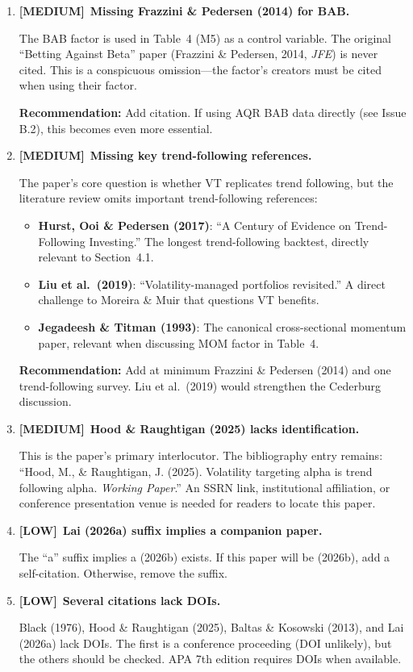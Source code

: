 \documentclass[12pt,a4paper]{article}
\newcommand{\MEDIUM}{\textcolor{medsev}{\textbf{[MEDIUM]}}}
\newcommand{\LOW}{\textcolor{lowsev}{\textbf{[LOW]}}}
\begin{document}
\begin{enumerate}[label=\textbf{D.\arabic*}]

\item \MEDIUM\ \textbf{Missing Frazzini \& Pedersen (2014) for BAB.}

The BAB factor is used in Table~4 (M5) as a control variable. The original ``Betting Against Beta'' paper (Frazzini \& Pedersen, 2014, \textit{JFE}) is never cited. This is a conspicuous omission---the factor's creators must be cited when using their factor.

\textbf{Recommendation:} Add citation. If using AQR BAB data directly (see Issue B.2), this becomes even more essential.


\item \MEDIUM\ \textbf{Missing key trend-following references.}

The paper's core question is whether VT replicates trend following, but the literature review omits important trend-following references:
\begin{itemize}
    \item \textbf{Hurst, Ooi \& Pedersen (2017)}: ``A Century of Evidence on Trend-Following Investing.'' The longest trend-following backtest, directly relevant to Section~4.1.
    \item \textbf{Liu et al.\ (2019)}: ``Volatility-managed portfolios revisited.'' A direct challenge to Moreira \& Muir that questions VT benefits.
    \item \textbf{Jegadeesh \& Titman (1993)}: The canonical cross-sectional momentum paper, relevant when discussing MOM factor in Table~4.
\end{itemize}

\textbf{Recommendation:} Add at minimum Frazzini \& Pedersen (2014) and one trend-following survey. Liu et al.\ (2019) would strengthen the Cederburg discussion.


\item \MEDIUM\ \textbf{Hood \& Raughtigan (2025) lacks identification.}

This is the paper's primary interlocutor. The bibliography entry remains: ``Hood, M., \& Raughtigan, J. (2025). Volatility targeting alpha is trend following alpha. \textit{Working Paper}.'' An SSRN link, institutional affiliation, or conference presentation venue is needed for readers to locate this paper.


\item \LOW\ \textbf{Lai (2026a) suffix implies a companion paper.}

The ``a'' suffix implies a (2026b) exists. If this paper will be (2026b), add a self-citation. Otherwise, remove the suffix.


\item \LOW\ \textbf{Several citations lack DOIs.}

Black (1976), Hood \& Raughtigan (2025), Baltas \& Kosowski (2013), and Lai (2026a) lack DOIs. The first is a conference proceeding (DOI unlikely), but the others should be checked. APA 7th edition requires DOIs when available.

\end{enumerate}
\end{document}

